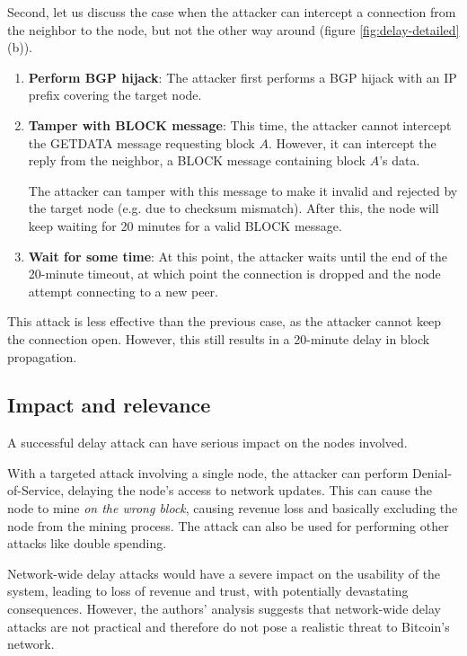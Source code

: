 \documentclass[12pt]{article}
\begin{document}
Second, let us discuss the case when the attacker can intercept a connection from the neighbor to the node, but not the other way around (figure \ref{fig:delay-detailed} (b)).

\begin{enumerate}
	\item \textbf{Perform BGP hijack}: The attacker first performs a BGP hijack with an IP prefix covering the target node.
	
	\item \textbf{Tamper with BLOCK message}: This time, the attacker cannot intercept the GETDATA message requesting block $A$. However, it can intercept the reply from the neighbor, a BLOCK message containing block $A$'s data.
	
The attacker can tamper with this message to make it invalid and rejected by the target node (e.g. due to checksum mismatch). After this, the node will keep waiting for 20 minutes for a valid BLOCK message.

	\item \textbf{Wait for some time}: At this point, the attacker waits until the end of the 20-minute timeout, at which point the connection is dropped and the node attempt connecting to a new peer.
\end{enumerate}

This attack is less effective than the previous case, as the attacker cannot keep the connection open. However, this still results in a 20-minute delay in block propagation.

\subsection{Impact and relevance}

A successful delay attack can have serious impact on the nodes involved.

With a targeted attack involving a single node, the attacker can perform Denial-of-Service, delaying the node's access to network updates. This can cause the node to mine \emph{on the wrong block}, causing revenue loss and basically excluding the node from the mining process. The attack can also be used for performing other attacks like double spending.

Network-wide delay attacks would have a severe impact on the usability of the system, leading to loss of revenue and trust, with potentially devastating consequences. However, the authors' analysis suggests that network-wide delay attacks are not practical and therefore do not pose a realistic threat to Bitcoin's network.
\end{document}
